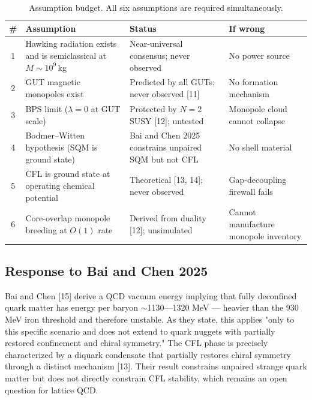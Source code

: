 \documentclass[12pt,a4paper]{article}
\begin{document}
\begin{table}[h]
\centering
\caption{Assumption budget. All six assumptions are required simultaneously.}
\label{tab:assumptions}
\small
\begin{tabular}{clll}
\hline
\textbf{\#} & \textbf{Assumption} & \textbf{Status} & \textbf{If wrong} \\
\hline
1 & \parbox[t]{4.5cm}{Hawking radiation exists and is semiclassical at $M \sim 10^9$\,kg} & \parbox[t]{4cm}{Near-universal consensus; never observed} & No power source \\[6pt]
2 & GUT magnetic monopoles exist & \parbox[t]{4cm}{Predicted by all GUTs; never observed [11]} & No formation mechanism \\[6pt]
3 & \parbox[t]{4.5cm}{BPS limit ($\lambda = 0$ at GUT scale)} & \parbox[t]{4cm}{Protected by $N{=}2$ SUSY [12]; untested} & \parbox[t]{3cm}{Monopole cloud cannot collapse} \\[6pt]
4 & \parbox[t]{4.5cm}{Bodmer--Witten hypothesis (SQM is ground state)} & \parbox[t]{4cm}{Bai and Chen 2025 constrains unpaired SQM but not CFL} & No shell material \\[6pt]
5 & \parbox[t]{4.5cm}{CFL is ground state at operating chemical potential} & \parbox[t]{4cm}{Theoretical [13, 14]; never observed} & \parbox[t]{3cm}{Gap-decoupling firewall fails} \\[6pt]
6 & \parbox[t]{4.5cm}{Core-overlap monopole breeding at $O(1)$ rate} & \parbox[t]{4cm}{Derived from duality [12]; unsimulated} & \parbox[t]{3cm}{Cannot manufacture monopole inventory} \\
\hline
\end{tabular}
\end{table}

\subsection{Response to Bai and Chen 2025}
Bai and Chen [15] derive a QCD vacuum energy implying that fully deconfined quark matter has energy per baryon $\sim$1130---1320 MeV --- heavier than the 930 MeV iron threshold and therefore unstable. As they state, this applies "only to this specific scenario and does not extend to quark nuggets with partially restored confinement and chiral symmetry." The CFL phase is precisely characterized by a diquark condensate that partially restores chiral symmetry through a distinct mechanism [13]. Their result constrains unpaired strange quark matter but does not directly constrain CFL stability, which remains an open question for lattice QCD.
\end{document}
